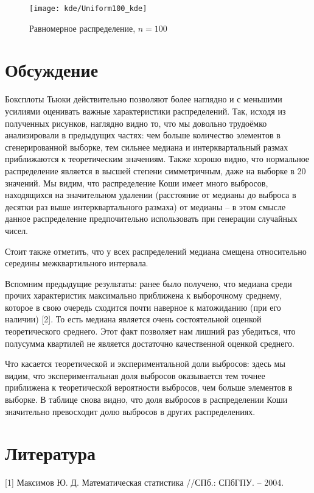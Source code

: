 \begin{figure}[H]
	\begin{center}
		\texttt{[image: kde/Uniform100\_kde]}
		\caption{Равномерное распределение, $n=100$} 
		\label{pic:pic_name} 
	\end{center}
\end{figure}

\section{Обсуждение}

Боксплоты Тьюки действительно позволяют более наглядно и с меньшими усилиями оценивать важные характеристики распределений. Так, исходя из полученных рисунков, наглядно видно то, что мы довольно трудоёмко анализировали в предыдущих частях: чем больше количество элементов в сгенерированной выборке, тем сильнее медиана и интерквартальный размах приближаются к теоретическим значениям. Также хорошо видно, что нормальное распределение является в высшей степени симметричным, даже на выборке в 20 значений. Мы видим, что распределение Коши имеет много выбросов, находящихся на значительном удалении (расстояние от медианы до выброса в десятки раз выше интерквартального размаха) от медианы -- в этом смысле данное распределение предпочительно использовать при генерации случайных чисел.

Стоит также отметить, что у всех распределений медиана смещена относительно середины межквартильного интервала. 

Вспомним предыдущие результаты: ранее было получено, что медиана среди прочих характеристик максимально приближена к выборочному среднему, которое в свою очередь сходится почти наверное к матожиданию (при его наличии) [2]. То есть медиана является очень состоятельной оценкой теоретического среднего. Этот факт позволяет нам лишний раз убедиться, что полусумма квартилей не является достаточно качественной оценкой среднего.

Что касается теоретической и экспериментальной доли выбросов: здесь мы видим, что экспериментальная доля выбросов оказывается тем точнее приближена к теоретической вероятности выбросов, чем больше элементов в выборке. В таблице снова видно, что доля выбросов в распределении Коши значительно превосходит долю выбросов в других распределениях.

\section{Литература}
[1] Максимов Ю. Д. Математическая статистика //СПб.: СПбГПУ. – 2004.

